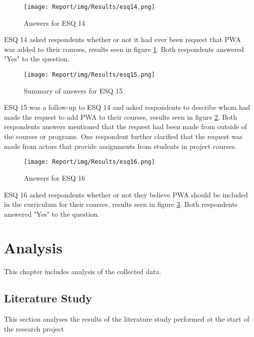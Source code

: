 \documentclass[a4paper,12pt]{article}
\renewcommand{\arraystretch}{1.5}
\begin{document}
\begin{figure}[ht!]
    \centering
    \texttt{[image: Report/img/Results/esq14.png]}
    \caption{Answers for ESQ 14}
    \label{fig:res_eduq14}
\end{figure}

ESQ 14 asked respondents whether or not it had ever been request that PWA was added to their courses, results seen in figure \ref{fig:res_eduq14}. Both respondents answered "Yes" to the question.

\begin{figure}[ht!]
    \centering
    \texttt{[image: Report/img/Results/esq15.png]}
    \caption{Summary of answers for ESQ 15}
    \label{fig:res_eduq15}
\end{figure}

\newpage ESQ 15 was a follow-up to ESQ 14 and asked respondents to describe whom had made the request to add PWA to their courses, results seen in figure \ref{fig:res_eduq15}. Both respondents answers mentioned that the request had been made from outside of the courses or programs. One respondent further clarified that the request was made from actors that provide assignments from students in project courses. 

\begin{figure}[ht!]
    \centering
    \texttt{[image: Report/img/Results/esq16.png]}
    \caption{Answers for ESQ 16}
    \label{fig:res_eduq16}
\end{figure}

ESQ 16 asked respondents whether or not they believe PWA should be included in the curriculum for their courses, results seen in figure \ref{fig:res_eduq16}. Both respondents answered "Yes" to the question.

\setlength{\arrayrulewidth}{0.5mm}
\setlength{\tabcolsep}{8pt}
\renewcommand{\arraystretch}{1.5}
\newpage
	
\section{Analysis}
This chapter includes analysis of the collected data.

\subsection{Literature Study}
This section analyses the results of the literature study performed at the start of the research project
\end{document}
